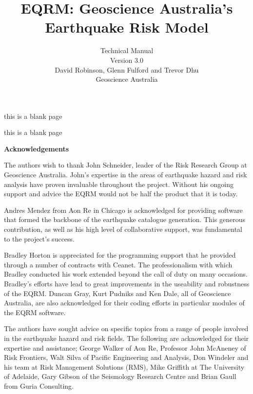 \documentclass[a4paper, 12pt]{report}
\title{EQRM: Geoscience Australia's Earthquake Risk Model\\
}
\author{Technical Manual \\[1em]
Version 3.0 \\[3em]
David Robinson, Glenn Fulford and Trevor Dhu\\[1em]
Geoscience Australia}
\begin{document}
\maketitle


this is a blank page \newpage


this is a blank page
\newpage

 {\Huge \textbf{Acknowledgements}  }

The authors wish to thank John Schneider, leader of the Risk
Research Group at Geoscience Australia. John's expertise in the
areas of earthquake hazard and risk analysis have proven
invaluable throughout the project. Without his ongoing support and
advice the EQRM would not be half the product that it is today.

Andres Mendez from Aon Re in Chicago is acknowledged for providing
software that formed the backbone of the earthquake catalogue
generation. This generous contribution, as well as his high level
of collaborative support, was fundamental to the project's
success.

Bradley Horton is appreciated for the programming support that he
provided through a number of contracts with Ceanet. The
professionalism with which Bradley conducted his work extended
beyond the call of duty on many occasions. Bradley's efforts have
lead to great improvements in the useability and robustness of the
EQRM. Duncan Gray, Kurt Pudniks and Ken Dale, all of Geoscience
Australia, are also acknowledged for their coding efforts in
particular modules of the EQRM software.

The authors have sought advice on specific topics from a range of
people involved in the earthquake hazard and risk fields. The
following are acknowledged for their expertise and assistance;
George Walker of Aon Re, Professor John McAneney of Risk
Frontiers, Walt Silva of Pacific Engineering and Analysis, Don
Windeler and his team at Risk Management Solutions (RMS), Mike
Griffith at The University of Adelaide, Gary Gibson of the
Seismology Research Centre and Brian Gaull from Guria Consulting.
\end{document}
